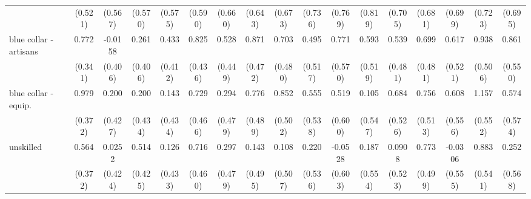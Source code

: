 {\begin{tabular}{l*{16}{c}}
                    &     (0.521)         &     (0.567)         &     (0.570)         &     (0.575)         &     (0.590)         &     (0.660)         &     (0.643)         &     (0.673)         &     (0.736)         &     (0.769)         &     (0.819)         &     (0.705)         &     (0.681)         &     (0.699)         &     (0.723)         &     (0.695)         \\
[1em]
blue collar - artisans&       0.772\sym{*}  &     -0.0158         &       0.261         &       0.433         &       0.825         &       0.528         &       0.871         &       0.703         &       0.495         &       0.771         &       0.593         &       0.539         &       0.699         &       0.617         &       0.938         &       0.861         \\
                    &     (0.341)         &     (0.406)         &     (0.406)         &     (0.412)         &     (0.436)         &     (0.449)         &     (0.472)         &     (0.480)         &     (0.517)         &     (0.570)         &     (0.519)         &     (0.481)         &     (0.481)         &     (0.521)         &     (0.506)         &     (0.550)         \\
[1em]
blue collar - equip.&       0.979\sym{**} &       0.200         &       0.200         &       0.143         &       0.729         &       0.294         &       0.776         &       0.852         &       0.555         &       0.519         &       0.105         &       0.684         &       0.756         &       0.608         &       1.157\sym{*}  &       0.574         \\
                    &     (0.372)         &     (0.427)         &     (0.434)         &     (0.434)         &     (0.466)         &     (0.479)         &     (0.489)         &     (0.502)         &     (0.538)         &     (0.600)         &     (0.547)         &     (0.526)         &     (0.513)         &     (0.556)         &     (0.552)         &     (0.574)         \\
[1em]
unskilled           &       0.564         &      0.0252         &       0.514         &       0.126         &       0.716         &       0.297         &       0.143         &       0.108         &       0.220         &     -0.0528         &       0.187         &      0.0908         &       0.773         &     -0.0306         &       0.883         &       0.252         \\
                    &     (0.372)         &     (0.424)         &     (0.425)         &     (0.433)         &     (0.460)         &     (0.479)         &     (0.495)         &     (0.507)         &     (0.536)         &     (0.603)         &     (0.554)         &     (0.523)         &     (0.499)         &     (0.555)         &     (0.541)         &     (0.568)         \\

\end{tabular}}
